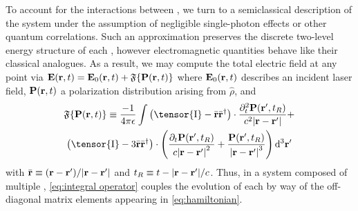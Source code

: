 To account for the interactions between \qds{}, we turn to a semiclassical description of the system under the assumption of negligible single-photon effects or other quantum correlations.
Such an approximation preserves the discrete two-level energy structure of each \qd{}, however electromagnetic quantities behave like their classical analogues.
As a result, we may compute the total electric field at any point via $\vb{E}(\vb{r}, t) = \vb{E}_0(\vb{r}, t) + \mathfrak{F}\{ \vb{P}(\vb{r}, t) \}$
where $\vb{E}_0(\vb{r}, t)$ describes an incident laser field, $\vb{P}(\vb{r}, t)$ a polarization distribution arising from $\hat{\rho}$, and
\begin{equation}
  \begin{gathered}
    \mathfrak{F}\{\vb{P}(\vb{r}, t)\} \equiv
      \frac{-1}{4\pi \epsilon} \int
      \left(\tensor{\mathrm{I}} -  \bar{\mathbf{r}}\bar{\mathbf{r}}^\dagger\right) \cdot \frac{\partial_t^2 \mathbf{P}(\mathbf{r}', t_R)}{c^2 \abs{\mathbf{r}-\mathbf{r}'}} + \\
      \left(\tensor{\mathrm{I}} - 3\bar{\mathbf{r}}\bar{\mathbf{r}}^\dagger\right) \cdot \qty(
        \frac{\partial_t   \mathbf{P}(\mathbf{r}', t_R)}{c \abs{\mathbf{r}-\mathbf{r}'}^2} +
        \frac{             \mathbf{P}(\mathbf{r}', t_R)}{  \abs{\mathbf{r}-\mathbf{r}'}^3}
      )
    \, \mathrm{d}^3 \mathbf{r'}
  \end{gathered}
  \label{eq:integral operator}
\end{equation}
with $\bar{\vb{r}} \equiv \qty(\vb{r} - \vb{r}')/\abs{\vb{r} - \vb{r}'}$ and $t_R \equiv t - \abs{\vb{r} - \vb{r}'}/c$.
Thus, in a system composed of multiple \qds{}, \cref{eq:integral operator} couples the evolution of each \qd{} by way of the off-diagonal matrix elements appearing in \cref{eq:hamiltonian}.
